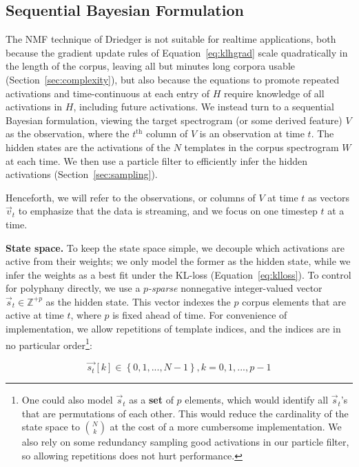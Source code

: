 \documentclass{article}
\begin{document}
\subsection{Sequential Bayesian Formulation}
\label{sec:bayesian}

    The NMF technique of Driedger is not suitable for realtime applications, both because the gradient update rules of Equation~\ref{eq:klhgrad} scale quadratically in the length of the corpus, leaving all but minutes long corpora usable (Section~\ref{sec:complexity}), but also because the equations to promote repeated activations and time-continuous at each entry of $H$ require knowledge of all activations in $H$, including future activations.  We instead turn to a sequential Bayesian formulation, viewing the target spectrogram (or some derived feature) $V$ as the observation, where the $t^{\text{th}}$ column of $V$ is an observation at time $t$.  The hidden states are the activations of the $N$ templates in the corpus spectrogram $W$ at each time.  We then use a particle filter to efficiently infer the hidden activations (Section~\ref{sec:sampling}).
    
    Henceforth, we will refer to the observations, or columns of $V$ at time $t$ as vectors $\vec{v}_t$ to emphasize that the data is streaming, and we focus on one timestep $t$ at a time.  
    
    \textbf{State space.} To keep the state space simple, we decouple which activations are active from their weights; we only model the former as the hidden state, while we infer the weights as a best fit under the KL-loss (Equation~\ref{eq:klloss}).  To control for polyphany directly, we use a {\em $p$-sparse} nonnegative integer-valued vector $\vec{s}_t \in \mathbb{Z}^{+p}$ as the hidden state.  This vector indexes the $p$ corpus elements that are active at time $t$, where $p$ is fixed ahead of time.  For convenience of implementation, we allow repetitions of template indices, and the indices are in no particular order\footnote{One could also model $\vec{s}_t$ as a \textbf{set} of $p$ elements, which would identify all $\vec{s}_t$'s that are permutations of each other.  This would reduce the cardinality of the state space to $\binom{N}{k}$ at the cost of a more cumbersome implementation.  We also rely on some redundancy sampling good activations in our particle filter, so allowing repetitions does not hurt performance.}:

    \begin{equation} 
        \label{eq:statevector}
        \vec{s_t}[k] \in \left\{0, 1, ..., N-1\right\}, k = 0, 1, ..., p-1 
    \end{equation}
\end{document}
